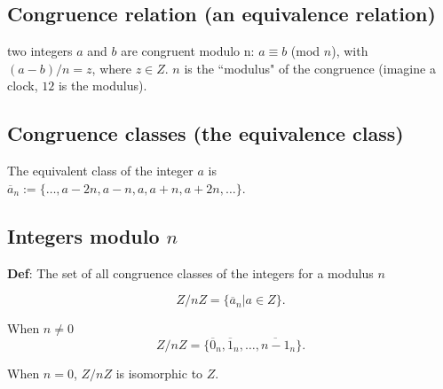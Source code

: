 \documentclass[12pt]{article}
\begin{document}
\subsection{Congruence relation (an equivalence relation)}
two integers $a$ and $b$ are congruent modulo n: $a \equiv b$ (mod $n$), with $(a-b)/n= z$, where $z \in Z$.
$n$ is the ``modulus" of the congruence (imagine a clock, $12$ is the modulus).

\subsection{Congruence classes (the equivalence class)}
The equivalent class of the integer $a$ is $\overline{a}_n := \{ \dotsc, a-2n, a-n, a, a+n, a+2n, \dotsc \}$.

\subsection{Integers modulo $n$}
{\bf Def}: The set of all congruence classes of the integers for a modulus $n$

\begin{equation}
  Z/nZ = \{ \overline{a}_n | a \in Z \}.
\end{equation}

When $n \neq 0$ 
\begin{equation}
  Z/nZ = \{ \overline{0}_n, \overline{1}_n, \dotsc, \overline{n-1}_n \}.
\end{equation}

When $n= 0$, $Z/nZ$ is isomorphic to $Z$.
\end{document}
